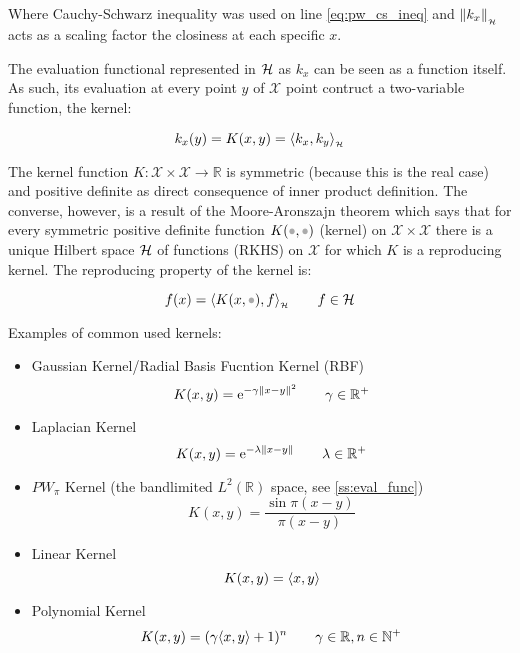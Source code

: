 Where Cauchy-Schwarz inequality was used on line \ref{eq:pw_cs_ineq} and
\(\left\lVert k_x\right\rVert_{_{\mathcal{H}}}\) acts as a scaling factor the closiness at each specific $x$.

The evaluation functional represented in $\mathcal{H}$ as $k_x$ can be seen as a
function itself. As such, its evaluation at every point $y$ of $\mathcal{X}$
point contruct a two-variable function, the kernel:

\begin{equation}
k_x(y) = K(x,y) = \langle k_x,k_y\rangle_{_{\mathcal{H}}}
\end{equation}

The kernel function \(K:\mathcal{X}\times\mathcal{X}\to\mathbb{R}\) is
symmetric (because this is the real case) and positive definite as direct consequence of
inner product definition. The converse, however, is a result of the
Moore-Aronszajn theorem which says that for every symmetric positive definite
function $K(\parm,\parm)$ (kernel) on \(\mathcal{X}\times\mathcal{X}\) there is a unique
Hilbert space $\mathcal{H}$ of functions (RKHS) on \(\mathcal{X}\) for which $K$ is a
reproducing kernel. The reproducing property of the kernel is:

\begin{equation}
f(x) = \hip{K(x,\parm)}{f} \qquad f \in \hs
\end{equation}

Examples of common used kernels:
\begin{itemize}
  \item Gaussian Kernel/Radial Basis Fucntion Kernel (RBF)
  \begin{equation*}
  K(x,y) = \mathrm{e}^{-\gamma\left\lVert x-y\right\rVert^2} \qquad \gamma \in \mathbb{R}^+
  \end{equation*}
  \item Laplacian Kernel
  \begin{equation*}
  K(x,y) = \mathrm{e}^{-\lambda\left\lVert x-y\right\rVert} \qquad \lambda \in \mathbb{R}^+
  \end{equation*}
  \item $PW_\pi$ Kernel (the bandlimited $L^2(\mathbb{R})$ space, see
  \ref{ss:eval_func})
  \begin{equation*}
  K(x,y) = \frac{\sin \pi(x-y)}{\pi(x-y)}
  \end{equation*}
  \item Linear Kernel
  \begin{equation*}
  K(x,y) = \langle x,y\rangle
  \end{equation*}
  \item Polynomial Kernel
  \begin{equation*}
  K(x,y) = (\gamma\langle x,y\rangle+1)^n \qquad \gamma \in \mathbb{R}, n \in
  \mathbb{N}^+
  \end{equation*}
\end{itemize}

